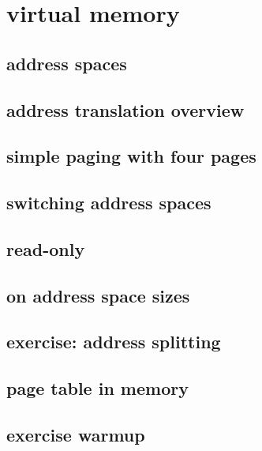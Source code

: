 

\section{virtual memory}

\subsection{address spaces}



\subsection{address translation overview}


\subsection{simple paging with four pages}


\subsection{switching address spaces}


\subsection{read-only}

\subsection{on address space sizes}


\subsection{exercise: address splitting}


\subsection{page table in memory}



\subsection{exercise warmup}

